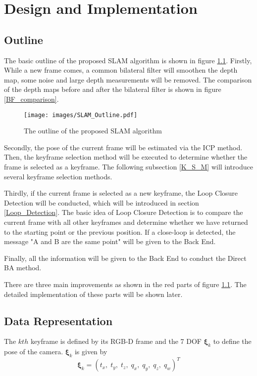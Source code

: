 \chapter{Design and Implementation}
\label{cha:impl}

\section{Outline}
The basic outline of the proposed \ac{SLAM} algorithm is shown in figure \ref{SLAM_Outline}. Firstly, While a new frame comes, a common bilateral filter will smoothen the depth map, some noise and large depth measurements will be removed. The comparison of the depth maps before and after the bilateral filter is shown in figure \ref{BF_comparison}.
\begin{figure}[thb]
    \centering
    \texttt{[image: images/SLAM\_Outline.pdf]}
    \caption[The outline of proposed SLAM algorithm]{The outline of the proposed SLAM algorithm}\label{SLAM_Outline}
\end{figure}

Secondly, the pose of the current frame will be estimated via the \ac{ICP} method. Then, the keyframe selection method will be executed to determine whether the frame is selected as a keyframe. The following subsection \ref{K_S_M} will introduce several keyframe selection methods.

Thirdly, if the current frame is selected as a new keyframe, the Loop Closure Detection will be conducted, which will be introduced in section \ref{Loop_Detection}. The basic idea of Loop Closure Detection is to compare the current frame with all other keyframes and determine whether we have returned to the starting point or the previous position. If a close-loop is detected, the message "A and B are the same point" will be given to the Back End. 

Finally, all the information will be given to the Back End to conduct the Direct BA method. 

There are three main improvements as shown in the red parts of figure \ref{SLAM_Outline}. The detailed implementation of these parts will be shown later.

\section{Data Representation}
\label{Data_Representation}

The $kth$ keyframe is defined by its RGB-D frame and the 7 \ac{DOF} $\boldsymbol{\xi}_k$ to define the pose of the camera. $\boldsymbol{\xi}_k$ is given by
\begin{equation}
    \boldsymbol{\xi}_k=(t_x,\; t_y,\; t_z,\; q_x,\; q_y,\; q_z,\; q_w)^T
\end{equation}

